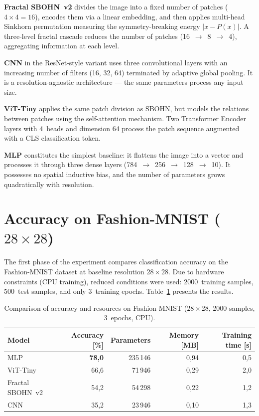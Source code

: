\documentclass[11pt,a4paper]{report}
\begin{document}
\textbf{Fractal SBOHN~v2} divides the image into a fixed number of patches ($4\times4 = 16$), encodes them via a linear embedding, and then applies multi-head Sinkhorn permutation measuring the symmetry-breaking energy $|x - P(x)|$. A three-level fractal cascade reduces the number of patches (16~$\to$~8~$\to$~4), aggregating information at each level.

\textbf{CNN} in the ResNet-style variant uses three convolutional layers with an increasing number of filters (16, 32, 64) terminated by adaptive global pooling. It is a resolution-agnostic architecture --- the same parameters process any input size.

\textbf{ViT-Tiny} applies the same patch division as SBOHN, but models the relations between patches using the self-attention mechanism. Two Transformer Encoder layers with 4~heads and dimension 64 process the patch sequence augmented with a CLS classification token.

\textbf{MLP} constitutes the simplest baseline: it flattens the image into a vector and processes it through three dense layers (784~$\to$~256~$\to$~128~$\to$~10). It possesses no spatial inductive bias, and the number of parameters grows quadratically with resolution.


\section{Accuracy on Fashion-MNIST ($28\times28$)}

The first phase of the experiment compares classification accuracy on the Fashion-MNIST dataset at baseline resolution $28\times28$. Due to hardware constraints (CPU training), reduced conditions were used: 2000~training samples, 500~test samples, and only 3~training epochs. Table~\ref{tab:sota_acc} presents the results.

\begin{table}[htbp]
\centering
\caption{Comparison of accuracy and resources on Fashion-MNIST ($28\times28$, 2000 samples, 3~epochs, CPU).}
\label{tab:sota_acc}
\begin{tabular}{|l|r|r|r|r|}
\hline
\textbf{Model} & \textbf{Accuracy [\%]} & \textbf{Parameters} & \textbf{Memory [MB]} & \textbf{Training time [s]} \\
\hline
MLP & \textbf{78,0} & 235\,146 & 0,94 & 0,5 \\
\hline
ViT-Tiny & 66,6 & 71\,946 & 0,29 & 2,0 \\
\hline
Fractal SBOHN~v2 & 54,2 & 54\,298 & 0,22 & 1,2 \\
\hline
CNN & 35,2 & 23\,946 & 0,10 & 1,3 \\
\hline
\end{tabular}
\end{table}
\end{document}
